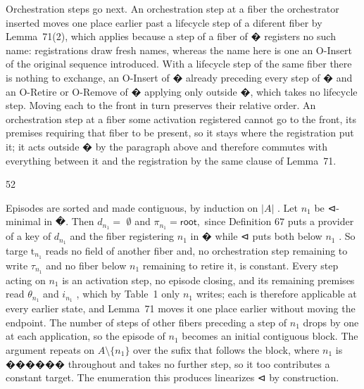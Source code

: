 \documentclass[
  10
]{article}
\begin{document}
Orchestration steps go next. An orchestration step at a fiber the
orchestrator inserted moves one place earlier past a lifecycle step of a
diferent fiber by Lemma~71(2), which applies because a step of a fiber
of � registers no such name: registrations draw fresh names, whereas the
name here is one an O-Insert of the original sequence introduced. With a
lifecycle step of the same fiber there is nothing to exchange, an
O-Insert of � already preceding every step of � and an O-Retire or
O-Remove of � applying only outside �, which takes no lifecycle step.
Moving each to the front in turn preserves their relative order. An
orchestration step at a fiber some activation registered cannot go to
the front, its premises requiring that fiber to be present, so it stays
where the registration put it; it acts outside � by the paragraph above
and therefore commutes with everything between it and the registration
by the same clause of Lemma~71.

52

Episodes are sorted and made contiguous, by induction on \(| A |\) . Let
\(n _ { 1 }\) be ⊲-minimal in �. Then \(d _ { n _ { 1 } } =\)
\(\emptyset\) and \(\pi _ { n _ { 1 } } = \mathsf { r o o t } ,\) since
Definition \(6 7\) puts a provider of a key of \(d _ { n _ { 1 } }\) and
the fiber registering \(n _ { 1 }\) in � while ⊲ puts both below
\(n _ { 1 }\) . So targe \(\mathrm { t } _ { n _ { 1 } }\) reads no
field of another fiber and, no orchestration step remaining to write
\(\tau _ { n _ { 1 } }\) and no fiber below \(n _ { 1 }\) remaining to
retire it, is constant. Every step acting on \(n _ { 1 }\) is an
activation step, no episode closing, and its remaining premises read
\(\theta _ { n _ { 1 } }\) and \(i _ { n _ { 1 } }\) , which by Table~1
only \(n _ { 1 }\) writes; each is therefore applicable at every earlier
state, and Lemma~71 moves it one place earlier without moving the
endpoint. The number of steps of other fibers preceding a step of
\(n _ { 1 }\) drops by one at each application, so the episode of
\(n _ { 1 }\) becomes an initial contiguous block. The argument repeats
on \(A \setminus \{ n _ { 1 } \}\) over the sufix that follows the
block, where \(n _ { 1 }\) is ������ throughout and takes no further
step, so it too contributes a constant target. The enumeration this
produces linearizes ⊲ by construction.
\end{document}
